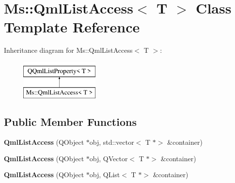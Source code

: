 \hypertarget{class_ms_1_1_qml_list_access}{}\section{Ms\+:\+:Qml\+List\+Access$<$ T $>$ Class Template Reference}
\label{class_ms_1_1_qml_list_access}
Inheritance diagram for Ms\+:\+:Qml\+List\+Access$<$ T $>$\+:\begin{figure}[H]
\begin{center}
\leavevmode
\includegraphics[height=2.000000cm]{class_ms_1_1_qml_list_access}
\end{center}
\end{figure}
\subsection*{Public Member Functions}
\begin{DoxyCompactItemize}
\item 
\mbox{\label{class_ms_1_1_qml_list_access_a3444e7681630d7c22e2f72dd61c125e1}} 
{\bfseries Qml\+List\+Access} (Q\+Object $\ast$obj, std\+::vector$<$ T $\ast$$>$ \&container)
\item 
\mbox{\label{class_ms_1_1_qml_list_access_a4f29050551d22ada68320cf8460af400}} 
{\bfseries Qml\+List\+Access} (Q\+Object $\ast$obj, Q\+Vector$<$ T $\ast$$>$ \&container)
\item 
\mbox{\label{class_ms_1_1_qml_list_access_abe30787fd857c0b7d93745a3b524b1c2}} 
{\bfseries Qml\+List\+Access} (Q\+Object $\ast$obj, Q\+List$<$ T $\ast$$>$ \&container)
\end{DoxyCompactItemize}
